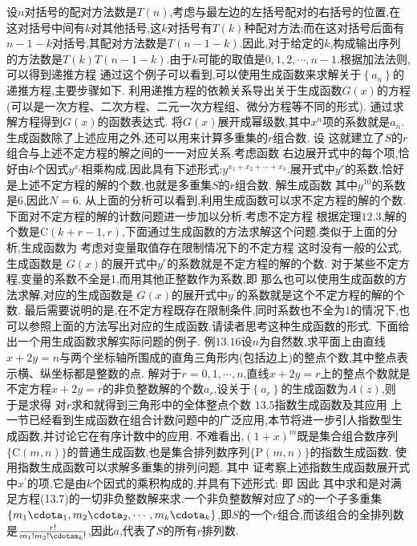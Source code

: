 设$n$对括号的配对方法数是$T(n)$,考虑与最左边的左括号配对的右括号的位置,在这对括号中间有$k$对其他括号,这$k$对括号有$T(k)$种配对方法;而在这对括号后面有$n-1-k$对括号,其配对方法数是$T(n-1-k)$.因此,对于给定的$k$,构成输出序列的方法数是$T(k)T(n-1-k)$.由于$k$可能的取值是$0,1,2,\cdots,n-1$.根据加法法则,可以得到递推方程
通过这个例子可以看到,可以使用生成函数来求解关于$\left\{a_{n}\right\}$的递推方程,主要步骤如下.
利用递推方程的依赖关系导出关于生成函数$G(x)$的方程(可以是一次方程、二次方程、二元一次方程组、微分方程等不同的形式).
通过求解方程得到$G(x)$的函数表达式.
将$G(x)$展开成幂级数,其中$x^{n}$项的系数就是$a_{n}$.
生成函数除了上述应用之外,还可以用来计算多重集的$r$组合数.
设
这就建立了$S$的$r$组合与上述不定方程的解之间的一一对应关系.考虑函数
右边展开式中的每个项,恰好由$k$个因式$y^{x_{i}}$相乘构成,因此具有下述形式:$y^{x_{1}+x_{2}+\cdots+x_{k}}$.展开式中$y^{r}$的系数,恰好是上述不定方程的解的个数,也就是多重集$S$的$r$组合数.
解生成函数
其中$y^{10}$的系数是6,因此$N=6$.
从上面的分析可以看到,利用生成函数可以求不定方程的解的个数.下面对不定方程的解的计数问题进一步加以分析.考虑不定方程
根据定理$12.3$,解的个数是$\mathrm{C}(k+r-1,r)$,下面通过生成函数的方法求解这个问题.类似于上面的分析,生成函数为
考虑对变量取值存在限制情况下的不定方程
这时没有一般的公式,生成函数是
$G(x)$的展开式中$y^{r}$的系数就是不定方程的解的个数.
对于某些不定方程,变量的系数不全是1,而用其他正整数作为系数,即
那么也可以使用生成函数的方法求解,对应的生成函数是
$G(x)$的展开式中$y^{\prime}$的系数就是这个不定方程的解的个数.
最后需要说明的是,在不定方程既存在限制条件,同时系数也不全为1的情况下,也可以参照上面的方法写出对应的生成函数.请读者思考这种生成函数的形式.
下面给出一个用生成函数求解实际问题的例子.
例$13.16$设$n$为自然数,求平面上由直线$x+2y=n$与两个坐标轴所围成的直角三角形内(包括边上)的整点个数,其中整点表示横、纵坐标都是整数的点.
解对于$r=0,1,\cdots,n$,直线$x+2y=r$上的整点个数就是不定方程$x+2y=r$的非负整数解的个数$a_{r}$,设关于$\left\{a_{r}\right\}$的生成函数为$A(z)$,则
于是求得
对$r$求和就得到三角形中的全体整点个数
{$13.5$指数生成函数及其应用}
上一节已经看到生成函数在组合计数问题中的广泛应用,本节将进一步引人指数型生成函数,并讨论它在有序计数中的应用.
不难看出,$(1+x)^{m}$既是集合组合数序列$\{\mathrm{C}(m,n)\}$的普通生成函数,也是集合排列数序列$\{\mathrm{P}(m,n)\}$的指数生成函数.
使用指数生成函数可以求解多重集的排列问题.
其中
证考察上述指数生成函数展开式中$x^{\prime}$的项,它是由$k$个因式的乘积构成的,并具有下述形式:
即
因此
其中求和是对满足方程(13.7)的一切非负整数解来求.一个非负整数解对应了$S$的一个子多重集$\left\{m_{1}\cdota_{1},m_{2}\cdota_{2},\cdots,m_{k}\cdota_{k}\right\}$,即$S$的一个$r$组合,而该组合的全排列数是$\frac{r!}{m_{1}!m_{2}!\cdotsm_{k}!}$,因此$a$,代表了$S$的所有$r$排列数.
